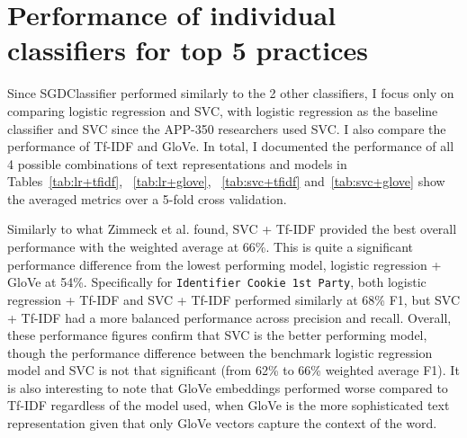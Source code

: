 \section{Performance of individual classifiers for top 5 practices}
Since SGDClassifier performed similarly to the 2 other classifiers, I focus only on comparing logistic regression and SVC, with logistic regression as the baseline classifier and SVC since the APP-350 researchers used SVC. I also compare the performance of Tf-IDF and GloVe. In total, I documented the performance of all 4 possible combinations of text representations and models in Tables~\ref{tab:lr+tfidf}, ~\ref{tab:lr+glove}, ~\ref{tab:svc+tfidf} and~\ref{tab:svc+glove} show the averaged metrics over a 5-fold cross validation. 

Similarly to what Zimmeck et al. found, SVC + Tf-IDF provided the best overall performance with the weighted average at 66\%. This is quite a significant performance difference from the lowest performing model, logistic regression + GloVe at 54\%. Specifically for \texttt{Identifier Cookie 1st Party}, both logistic regression + Tf-IDF and SVC + Tf-IDF performed similarly at 68\% F1, but SVC + Tf-IDF had a more balanced performance across precision and recall. Overall, these performance figures confirm that SVC is the better performing model, though the performance difference between the benchmark logistic regression model and SVC is not that significant (from 62\% to 66\% weighted average F1). It is also interesting to note that GloVe embeddings performed worse compared to Tf-IDF regardless of the model used, when GloVe is the more sophisticated text representation given that only GloVe vectors capture the context of the word.

